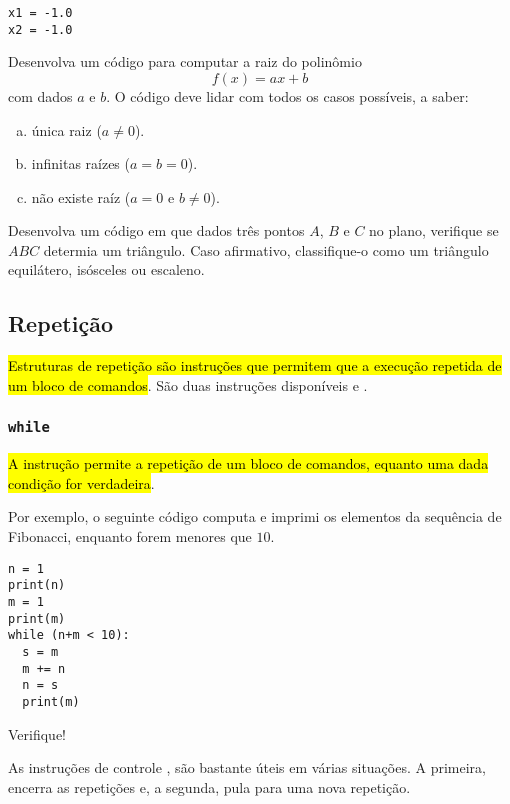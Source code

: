 \begin{verbatim}
x1 = -1.0
x2 = -1.0
\end{verbatim}

\begin{exr}
  Desenvolva um código para computar a raiz do polinômio
  \begin{equation}
    f(x) = ax + b
  \end{equation}
  com dados $a$ e $b$. O código deve lidar com todos os casos possíveis, a saber:
  \begin{enumerate}[a)]
    \item única raiz ($a\neq 0$).
    \item infinitas raízes ($a=b=0$).
    \item não existe raíz ($a = 0$ e $b \neq 0$).
  \end{enumerate}
\end{exr}

\begin{exr}
  Desenvolva um código em que dados três pontos $A$, $B$ e $C$ no plano, verifique se $ABC$ determia um triângulo. Caso afirmativo, classifique-o como um triângulo equilátero, isósceles ou escaleno.
\end{exr}

\subsection{Repetição}

\hl{Estruturas de repetição são instruções que permitem que a execução repetida de um bloco de comandos}. São duas instruções disponíveis {\PYTHONwhile} e {\PYTHONfor}.

\subsubsection{\texttt{while}}

\hl{A instrução {\PYTHONwhile} permite a repetição de um bloco de comandos, equanto uma dada condição for verdadeira}. 

Por exemplo, o seguinte código computa e imprimi os elementos da sequência de Fibonacci{\fibonacci}, enquanto forem menores que $10$.

\begin{lstlisting}
n = 1
print(n)
m = 1
print(m)
while (n+m < 10):
  s = m
  m += n
  n = s
  print(m)
\end{lstlisting}

Verifique!

\begin{obs}
  As instruções de controle {\PYTHONbreak}, {\PYTHONcontinue} são bastante úteis em várias situações. A primeira, encerra as repetições e, a segunda, pula para uma nova repetição.
\end{obs}

